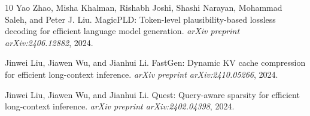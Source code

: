 \documentclass[11pt]{article}
\begin{document}
\begin{thebibliography}{10}
Yao Zhao, Misha Khalman, Rishabh Joshi, Shashi Narayan, Mohammad Saleh, and Peter J. Liu.
\newblock MagicPLD: Token-level plausibility-based lossless decoding for efficient language model generation.
\newblock \textit{arXiv preprint arXiv:2406.12882}, 2024.

Jinwei Liu, Jiawen Wu, and Jianhui Li.
\newblock FastGen: Dynamic KV cache compression for efficient long-context inference.
\newblock \textit{arXiv preprint arXiv:2410.05266}, 2024.

Jinwei Liu, Jiawen Wu, and Jianhui Li.
\newblock Quest: Query-aware sparsity for efficient long-context inference.
\newblock \textit{arXiv preprint arXiv:2402.04398}, 2024.

\end{thebibliography}
\end{document}
